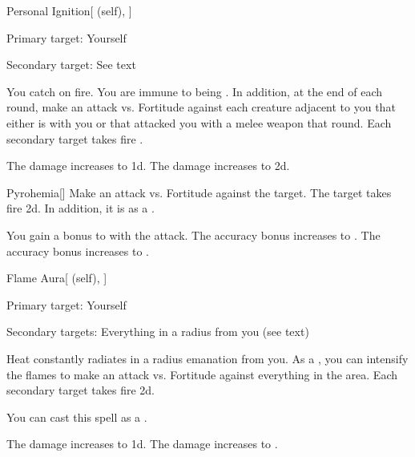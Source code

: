 \lowercase{\hypertarget{spell:Personal Ignition}{}}\label{spell:Personal Ignition}
\begin{attuneability}[Rank 3]{\hypertarget{spell:Personal Ignition}{Personal Ignition}}[ (self), ]

Primary target: Yourself
\par\noindent
Secondary target: See text

You catch on fire.
You are immune to being .
In addition, at the end of each round, make an attack vs. Fortitude against each creature adjacent to you that either is  with you or that attacked you with a melee weapon that round.
\hit Each secondary target takes fire .

\rankline
{} The damage increases to  \plus1d.
 The damage increases to  \plus2d.
\end{attuneability}
\vspace{0.25em}



\lowercase{\hypertarget{spell:Pyrohemia}{}}\label{spell:Pyrohemia}
\begin{freeability}[Rank 3]{\hypertarget{spell:Pyrohemia}{Pyrohemia}}[]
Make an attack vs. Fortitude against the target.
\hit The target takes fire  \minus2d.
In addition, it is  as a .

\rankline
{} You gain a  bonus to  with the attack.
 The accuracy bonus increases to .
 The accuracy bonus increases to .
\end{freeability}
\vspace{0.25em}



\lowercase{\hypertarget{spell:Flame Aura}{}}\label{spell:Flame Aura}
\begin{attuneability}[Rank 4]{\hypertarget{spell:Flame Aura}{Flame Aura}}[ (self), ]

Primary target: Yourself
\par\noindent
Secondary targets: Everything in a \areasmall radius from you (see text)

Heat constantly radiates in a \areasmall radius emanation from you.
As a , you can intensify the flames to make an attack vs. Fortitude against everything in the area.
\hit Each secondary target takes fire  \minus2d.

You can cast this spell as a .

\rankline
{} The damage increases to  \minus1d.
 The damage increases to .
\end{attuneability}
\vspace{0.25em}



